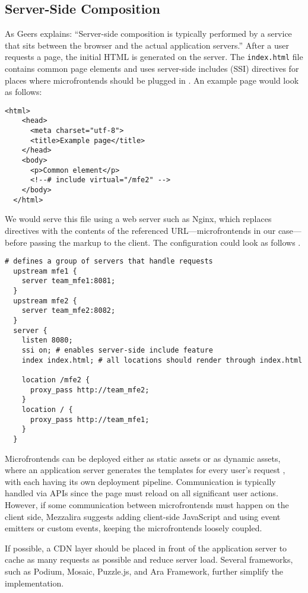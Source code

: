 \subsection{Server-Side Composition}
\label{subsec:ServerSide}
As Geers explains: ``Server-side composition is typically performed by a service that sits between the browser and the actual application servers.'' After a user requests a page, the initial HTML is generated on the server. The \texttt{index.html} file contains common page elements and uses server-side includes (SSI) directives for places where microfrontends should be plugged in \cite{Jackson}. An example page would look as follows:
\begin{lstlisting}[caption={Example of server-side composition using SSI}]
  <html>
    <head>
      <meta charset="utf-8">
      <title>Example page</title>
    </head>
    <body>
      <p>Common element</p>
      <!--# include virtual="/mfe2" -->
    </body>
  </html>
\end{lstlisting}
We would serve this file using a web server such as Nginx, which replaces directives with the contents of the referenced URL—microfrontends in our case—before passing the markup to the client. The configuration could look as follows \cite{Jackson}.
\begin{lstlisting}[caption={Example of Nginx configuration for server-side composition}]
  # defines a group of servers that handle requests
  upstream mfe1 { 
    server team_mfe1:8081;
  }
  upstream mfe2 {
    server team_mfe2:8082;
  }
  server {
    listen 8080;
    ssi on; # enables server-side include feature
    index index.html; # all locations should render through index.html

    location /mfe2 {
      proxy_pass http://team_mfe2;
    }
    location / {
      proxy_pass http://team_mfe1;
    }
  }
\end{lstlisting}
Microfrontends can be deployed either as static assets or as dynamic assets, where an application server generates the templates for every user's request \cite{MezzaliraBuildingMf}, with each having its own deployment pipeline. Communication is typically handled via APIs since the page must reload on all significant user actions. However, if some communication between microfrontends must happen on the client side, Mezzalira \cite{MezzaliraBuildingMf} suggests adding client-side JavaScript and using event emitters or custom events, keeping the microfrontends loosely coupled.

If possible, a CDN layer should be placed in front of the application server to cache as many requests as possible and reduce server load. Several frameworks, such as Podium, Mosaic, Puzzle.js, and Ara Framework, further simplify the implementation.

